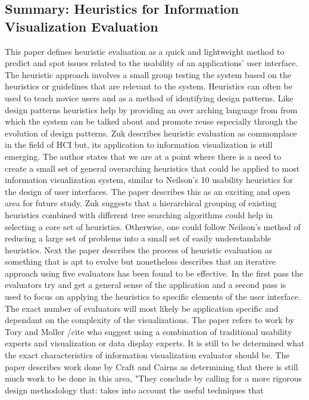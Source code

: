 \documentclass{sig-alternate}
\begin{document}
\subsection{Summary: Heuristics for Information Visualization Evaluation}
This paper defines heuristic evaluation as a quick and lightweight method to
predict and spot issues related to the usability of an applications' user
interface. The heuristic approach involves a small  group testing the system
based on the heuristics or guidelines that are relevant to the system.
Heuristics can often be used to teach novice users and as a method of
identifying design patterns. Like design patterns heuristics help by providing
an over arching language from from which the system can be talked about and
promote reuse especially through the evolution of design patterns. Zuk describes
heuristic evaluation as commonplace in the field of HCI but, its application to 
information visualization is still emerging.  The author states that we are at a
point where there is a need to create a small set of general  overarching
heuristics that could be applied to most information visualization system, 
similar to Neilson's 10 usability heuristics for the design of user interfaces.
The paper describes this as an exciting and open area for future study. Zuk
suggests  that a hierarchical grouping of existing heuristics combined with
different tree searching algorithms could help in selecting a core set of
heuristics. Otherwise,  one could follow Neilson's method of reducing a large
set of problems into a small set of easily understandable heuristics. Next the
paper describes the process of heuristic evaluation as something that is apt to
evolve but nonetheless describes that an iterative approach using five
evaluators has been found to be effective. In the first pass the evaluators try
and get a general sense of the application and a second pass is used to focus on
applying the heuristics to  specific elements of the user interface. The exact
number of evaluators will most likely be application specific and dependant on
the complexity of the visualizations. The paper refers to work by Tory and
Moller  /cite{} who suggest using a combination of traditional usability experts
and visualization or data display experts. It is still to be determined what the
exact characteristics of  information visualization evaluator should be.  The
paper describes work done by Craft and Cairns \cite{} as determining that there
is still much work to be done in this area, "They conclude by calling for a more
rigorous design methodology that: takes into account the useful techniques that
\end{document}
